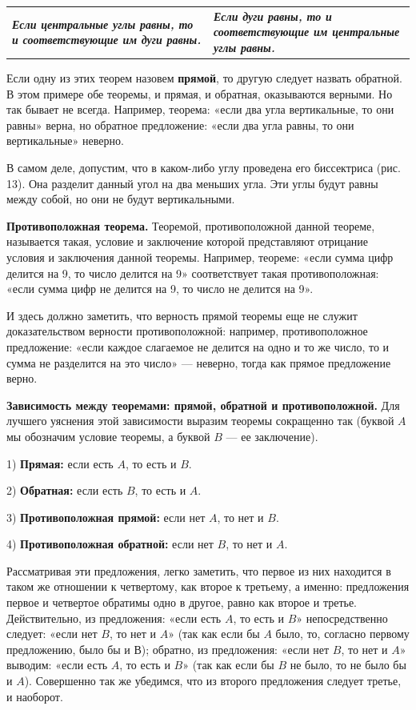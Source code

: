 \documentclass[oneside]{book}
\begin{document}
\noindent
\begin{tabular}{ p{}| p{} }
\textbf{\emph{Если центральные углы равны, то и соответствующие им дуги равны.}}
&
\textbf{\emph{Если дуги равны, то и соответствующие им центральные углы равны.}}
\end{tabular}

\medskip

Если одну из этих теорем назовем \textbf{прямой}, то другую следует назвать обратной.
В этом примере обе теоремы, и прямая, и обратная, оказываются верными.
Но так бывает не всегда.
Например, теорема:
«если два угла вертикальные, то они равны» верна, но обратное предложение:
«если два угла равны, то они вертикальные» неверно.

В самом деле, допустим, что в каком-либо углу проведена его биссектриса (рис. 13).
Она разделит данный угол на два меньших угла.
Эти углы будут равны между собой, но они не будут вертикальными.

\textbf{Противоположная теорема.}
Теоремой, противоположной данной теореме, называется такая, условие и заключение которой представляют отрицание условия и заключения данной теоремы.
Например, теореме:
«если сумма цифр делится на 9, то число делится на 9» соответствует такая противоположная:
«если сумма цифр не делится на 9, то число не делится на 9».

И здесь должно заметить, что верность прямой теоремы еще не служит доказательством верности противоположной:
например, противоположное предложение:
«если каждое слагаемое не делится на одно и то же число, то и сумма не разделится на это число» — неверно, тогда как прямое предложение верно.

\textbf{Зависимость между теоремами: прямой, обратной и противоположной.}
Для лучшего уяснения этой зависимости выразим теоремы сокращенно так (буквой $A$ мы обозначим условие теоремы, а буквой $B$ — ее заключение).

1) \textbf{Прямая:}
если есть $A$, то есть и $B$.

2) \textbf{Обратная:}
если есть $B$, то есть и $A$.

3) \textbf{Противоположная прямой:}
если нет $A$, то нет и $B$.

4) \textbf{Противоположная обратной:}
если нет $B$, то нет и $A$.

Рассматривая эти предложения, легко заметить, что первое из них находится в таком же отношении к четвертому, как второе к третьему, а именно:
предложения первое и четвертое обратимы одно в другое, равно как второе и третье.
Действительно, из предложения:
«если есть $A$, то есть и $B$» непосредственно следует:
«если нет $B$, то нет и $A$» (так как если бы $A$ было, то, согласно первому предложению, было бы и В);
обратно, из предложения:
«если нет $B$, то нет и $A$» выводим:
«если есть $A$, то есть и $B$» (так как если бы $B$ не было, то не было бы и $A$).
Совершенно так же убедимся, что из второго предложения следует третье, и наоборот.
\end{document}
